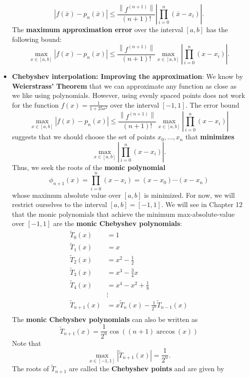 \documentclass{report}
\begin{document}
\begin{itemize}
    $$\left|f(\bar x) - p_n(\bar x)\right| \leq \frac{\left\|f^{(n+1)}\right\|}{(n+1)!} \left|\prod_{i=0}^n (\bar x-x_i)\right|.$$
    The \textbf{maximum approximation error} over the interval $[a,b]$ has the following bound:
    $$\max_{x \in [a,b]} \left|f(x) - p_n(x)\right| \leq \frac{\left\|f^{(n+1)}\right\|}{(n+1)!} \max_{x \in [a,b]} \left|\prod_{i=0}^n (x-x_i)\right|.$$
\item \textbf{Chebyshev interpolation:  Improving the approximation}:
    We know by \textbf{Weierstrass' Theorem} that we can approximate any function as close as we like using polynomials.
    However, using evenly spaced points does not work for the function $f(x) = \frac{1}{1+25x^2}$ over the interval $[-1,1]$.
    \bigbreak \noindent 
    The error bound 
    $$\max_{x \in [a,b]} \left|f(x) - p_n(x)\right| \leq \frac{\left\|f^{(n+1)}\right\|}{(n+1)!} \max_{x \in [a,b]} \left|\prod_{i=0}^n (x-x_i)\right|$$
    suggests that we should choose the set of points $x_0,\ldots,x_n$ that \textbf{minimizes}
    $$\max_{x \in [a,b]} \left|\prod_{i=0}^n (x-x_i)\right|.$$
    Thus, we seek the roots of the \textbf{monic polynomial} 
    $$\phi_{n+1}(x) = \prod_{i=0}^n (x-x_i) = (x-x_0)\cdots(x-x_n)$$
    whose maximum absolute value over $[a,b]$ is minimized. 
    \bigbreak \noindent 
    For now, we will restrict ourselves to the interval $[a,b] = [-1,1]$.
    \bigbreak \noindent 
    We will see in Chapter 12 that the monic polynomials that achieve the minimum max-absolute-value over $[-1,1]$ are the \textbf{monic Chebyshev polynomials}:
    $$
    \begin{align}
    \tilde T_0(x) &= 1 \\
    \tilde T_1(x) &= x \\
    \tilde T_2(x) &= x^2 - \frac12 \\
    \tilde T_3(x) &= x^3 - \frac34x \\
    \tilde T_4(x) &= x^4 - x^2 + \frac18 \\
    &\vdots\\
    \tilde T_{n+1}(x) &= x \tilde T_{n}(x) - \frac{1}{2^{n}} \tilde T_{n-1}(x)\\
    \end{align}
    $$
    \bigbreak \noindent 
    The \textbf{monic Chebyshev polynomials} can also be written as
    $$\tilde T_{n+1}(x) = \frac{1}{2^{n}}\cos((n+1) \arccos(x))$$
    \bigbreak \noindent 
    Note that
    $$\max_{x \in [-1,1]} \left| \tilde T_{n+1}(x) \right| = \frac{1}{2^n}.$$
    The roots of $\tilde T_{n+1}$ are called the \textbf{Chebyshev points} and are given by

\end{itemize}
\end{document}
